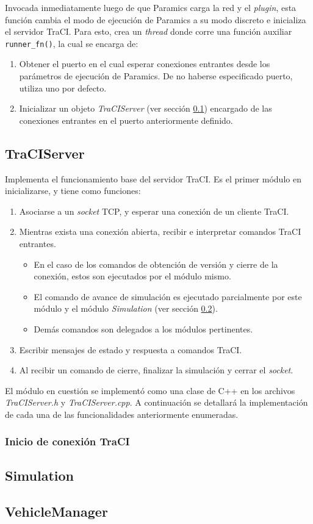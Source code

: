 Invocada inmediatamente luego de que Paramics carga la red y el \emph{plugin}, esta función cambia el modo de ejecución de Paramics a su modo discreto e inicializa el servidor TraCI. Para esto, crea un \emph{thread} donde corre una función auxiliar \texttt{runner\_fn()}, la cual se encarga de:

\begin{enumerate}
    \item Obtener el puerto en el cual esperar conexiones entrantes desde los parámetros de ejecución de Paramics. De no haberse especificado puerto, utiliza uno por defecto.
    \item Inicializar un objeto \emph{TraCIServer} (ver sección \ref{sec:traciserver}) encargado de las conexiones entrantes en el puerto anteriormente definido.
\end{enumerate}


\subsection{TraCIServer}\label{sec:traciserver}

Implementa el funcionamiento base del servidor TraCI. Es el primer módulo en inicializarse, y tiene como funciones:

\begin{enumerate}
    \item Asociarse a un \emph{socket} TCP, y esperar una conexión de un cliente TraCI.
    \item Mientras exista una conexión abierta, recibir e interpretar comandos TraCI entrantes.
    \begin{itemize}
        \item En el caso de los comandos de obtención de versión y cierre de la conexión, estos son ejecutados por el módulo mismo.
        \item El comando de avance de simulación es ejecutado parcialmente por este módulo y el módulo \emph{Simulation} (ver sección \ref{sec:simulation}).
        \item Demás comandos son delegados a los módulos pertinentes.
    \end{itemize}
    \item Escribir mensajes de estado y respuesta a comandos TraCI.
    \item Al recibir un comando de cierre, finalizar la simulación y cerrar el \emph{socket}.
\end{enumerate}

El módulo en cuestión se implementó como una clase de C++ en los archivos \emph{TraCIServer.h} y \emph{TraCIServer.cpp}. A continuación se detallará la implementación de cada una de las funcionalidades anteriormente enumeradas.

\subsubsection{Inicio de conexión TraCI}


\subsection{Simulation}\label{sec:simulation}
\subsection{VehicleManager}